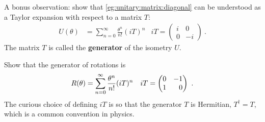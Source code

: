 \begin{exercise}
A bonus observation: show that \eqref{eg:unitary:matrix:diagonal} can be understood as a Taylor expansion with respect to a matrix $T$:
\begin{align}
    U(\theta) &= \sum_{n=0}^\infty \frac{\theta^n}{n!} (iT)^n
    &
    iT=
    \begin{pmatrix}
        i & 0\\
        0 & -i
    \end{pmatrix} \ .
\end{align}
The matrix $T$ is called the \textbf{generator} of the isometry $U$. 
\end{exercise}


\begin{exercise}
Show that the generator of rotations is
\begin{align}
    R(\theta) &= \sum_{n=0}^\infty \frac{\theta^n}{n!} (iT)^n
    &
    iT=
    \begin{pmatrix}
        0 & -1\\
        1 & \pp 0
    \end{pmatrix} \ .
\end{align}
The curious choice of defining $iT$ is so that the generator $T$ is Hermitian, $T^\dag = T$, which is a common convention in physics.
\end{exercise}



